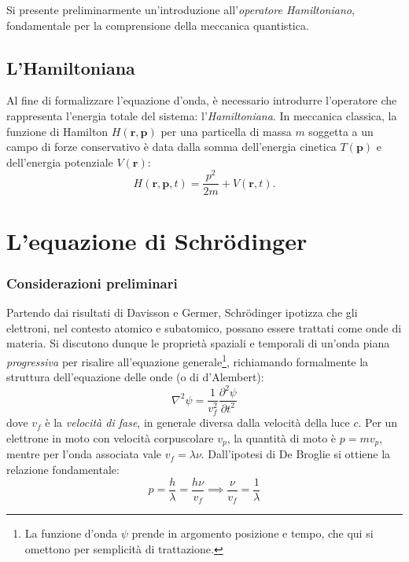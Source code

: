 \documentclass[a4paper,11pt]{report}
\begin{document}
\noindent
Si presente preliminarmente un'introduzione all'\textit{operatore Hamiltoniano}, fondamentale per la comprensione della meccanica quantistica.

\subsection{L'Hamiltoniana}
Al fine di formalizzare l'equazione d'onda, è necessario introdurre l'operatore che rappresenta l'energia totale del sistema: l'\textit{Hamiltoniana}.
In meccanica classica, la funzione di Hamilton $H(\bm{r}, \bm{p})$ per una particella di massa $m$ soggetta a un campo di forze conservativo è data dalla somma dell'energia cinetica $T(\bm{p})$ e dell'energia potenziale $V(\bm{r})$:
\begin{equation}
    H(\bm{r}, \bm{p}, t) = \frac{p^2}{2m} + V(\bm{r}, t).
\end{equation}

\section{L'equazione di Schrödinger}
\subsubsection{Considerazioni preliminari}
Partendo dai risultati di Davisson e Germer, Schrödinger ipotizza che gli elettroni, nel contesto atomico e subatomico, possano essere trattati come onde di materia.
Si discutono dunque le proprietà spaziali e temporali di un'onda piana \textit{progressiva} per risalire all'equazione generale\footnote{La funzione d'onda $\psi$ prende in argomento posizione e tempo, che qui si omettono per semplicità di trattazione.}, richiamando formalmente la struttura dell'equazione delle onde (o di d'Alembert):
\begin{equation}
    \nabla^2 \psi = \frac{1}{v_f^2}\frac{\partial^2 \psi}{\partial t^2}
\end{equation}
dove $v_f$ è la \textit{velocità di fase}, in generale diversa dalla velocità della luce $c$.
Per un elettrone in moto con velocità corpuscolare $v_p$, la quantità di moto è $p = m v_p$, mentre per l'onda associata vale $v_f = \lambda \nu$.
Dall'ipotesi di De Broglie si ottiene la relazione fondamentale:
\begin{equation}
    p = \frac{h}{\lambda} = \frac{h\nu}{v_f} \implies \frac{\nu}{v_f} = \frac{1}{\lambda}
    \label{eq:schrodi_1}
\end{equation}
\end{document}
